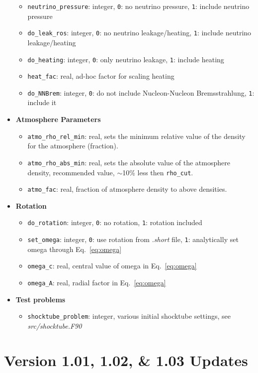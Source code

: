 \documentclass[10pt,nofootinbib]{article}
\newcommand{\code}[1]{\texttt{#1}}
\begin{document}
\begin{itemize}
\begin{itemize}
\item{{\tt neutrino\_pressure}: integer, \code{0}: no neutrino pressure, \code{1}: include neutrino pressure}
\item{{\tt do\_leak\_ros}: integer, \code{0}: no neutrino leakage/heating, \code{1}: include neutrino leakage/heating}
\item{{\tt do\_heating}: integer, \code{0}: only neutrino leakage, \code{1}: include heating}
\item{{\tt heat\_fac}: real, ad-hoc factor for scaling heating}
\item{{\tt do\_NNBrem}: integer, \code{0}: do not include Nucleon-Nucleon Bremsstrahlung, \code{1}: include it}
\end{itemize}
\item{{\bf Atmosphere Parameters}}
\begin{itemize}
\item{{\tt atmo\_rho\_rel\_min}: real, sets the minimum relative value of the density for the atmosphere (fraction).}
\item{{\tt atmo\_rho\_abs\_min}: real, sets the absolute value of the atmosphere density, recommended value, $\sim$10\% less then {\tt rho\_cut}.}
\item{{\tt atmo\_fac}: real, fraction of atmosphere density to above densities.} 
\end{itemize}
\item{{\bf Rotation}}
\begin{itemize}
\item{{\tt do\_rotation}: integer, \code{0}: no rotation, \code{1}: rotation included}
\item{{\tt set\_omega}: integer, \code{0}: use rotation from {\it .short} file, \code{1}: analytically set omega through Eq.~\ref{eq:omega}}
\item{{\tt omega\_c}: real, central value of omega in Eq.~\ref{eq:omega}}
\item{{\tt omega\_A}: real, radial factor in Eq.~\ref{eq:omega}}
\end{itemize}
\item{{\bf Test problems}}
\begin{itemize}
\item{{\tt shocktube\_problem}: integer, various initial shocktube settings, see {\it src/shocktube.F90}}
\end{itemize}
\end{itemize}

\section{Version 1.01, 1.02, \& 1.03 Updates}
\end{document}
